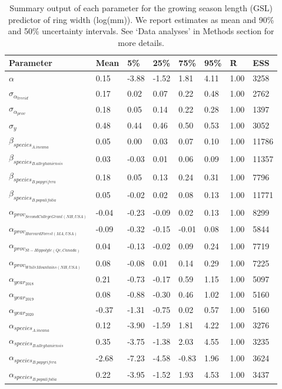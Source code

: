 \documentclass{article}\usepackage[]{graphicx}\usepackage[]{xcolor}
\begin{document}
\begin{table}[ht]
\centering
\caption{Summary output of each parameter for the growing season length (GSL) predictor of ring width (log(mm)). We report estimates as mean and 90\% and 50\% uncertainty intervals. See `Data analyses' in Methods section for more details.} 
\label{tab:tab_GSL}
\begin{tabular}{llllllll}
  \hline
Parameter & Mean & 5\% & 25\% & 75\% & 95\% & \^R & ESS \\ 
  \hline
$\alpha$ & 0.15 & -3.88 & -1.52 & 1.81 & 4.11 & 1.00 & 3258 \\ 
  $\sigma_{\alpha_{treeid}}$ & 0.17 & 0.02 & 0.07 & 0.22 & 0.48 & 1.00 & 2762 \\ 
  $\sigma_{\alpha_{prov}}$ & 0.18 & 0.05 & 0.14 & 0.22 & 0.28 & 1.00 & 1397 \\ 
  $\sigma_{y}$ & 0.48 & 0.44 & 0.46 & 0.50 & 0.53 & 1.00 & 3052 \\ 
  $\beta_{species_{A. incana}}$ & 0.05 & 0.00 & 0.03 & 0.07 & 0.10 & 1.00 & 11786 \\ 
  $\beta_{species_{B. alleghaniensis}}$ & 0.03 & -0.03 & 0.01 & 0.06 & 0.09 & 1.00 & 11357 \\ 
  $\beta_{species_{B. papyrifera}}$ & 0.18 & 0.05 & 0.13 & 0.24 & 0.31 & 1.00 & 7796 \\ 
  $\beta_{species_{B. populifolia}}$ & 0.05 & -0.02 & 0.02 & 0.08 & 0.13 & 1.00 & 11771 \\ 
  $\alpha_{prov_{Second College Grant (NH, USA)}}$ & -0.04 & -0.23 & -0.09 & 0.02 & 0.13 & 1.00 & 8299 \\ 
  $\alpha_{prov_{Harvard Forest (MA, USA)}}$ & -0.09 & -0.32 & -0.15 & -0.01 & 0.08 & 1.00 & 5844 \\ 
  $\alpha_{prov_{St-Hippolyte (Qc, Canada)}}$ & 0.04 & -0.13 & -0.02 & 0.09 & 0.24 & 1.00 & 7719 \\ 
  $\alpha_{prov_{White Mountains (NH, USA)}}$ & 0.08 & -0.08 & 0.01 & 0.14 & 0.29 & 1.00 & 7225 \\ 
  $\alpha_{year_{2018}}$ & 0.21 & -0.73 & -0.17 & 0.59 & 1.15 & 1.00 & 5097 \\ 
  $\alpha_{year_{2019}}$ & 0.08 & -0.88 & -0.30 & 0.46 & 1.02 & 1.00 & 5160 \\ 
  $\alpha_{year_{2020}}$ & -0.37 & -1.31 & -0.75 & 0.02 & 0.57 & 1.00 & 5160 \\ 
  $\alpha_{species_{A. incana}}$ & 0.12 & -3.90 & -1.59 & 1.81 & 4.22 & 1.00 & 3276 \\ 
  $\alpha_{species_{B. alleghaniensis}}$ & 0.35 & -3.75 & -1.38 & 2.03 & 4.55 & 1.00 & 3235 \\ 
  $\alpha_{species_{B. papyrifera}}$ & -2.68 & -7.23 & -4.58 & -0.83 & 1.96 & 1.00 & 3624 \\ 
  $\alpha_{species_{B. populifolia}}$ & 0.22 & -3.95 & -1.52 & 1.93 & 4.53 & 1.00 & 3437 \\ 
   \hline
\end{tabular}
\end{table}
\end{document}

